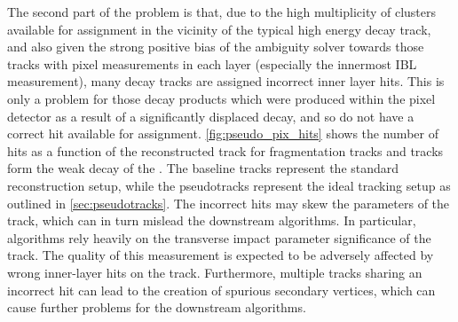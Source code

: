 The second part of the problem is that, due to the high multiplicity of clusters available for assignment in the vicinity of the typical high energy \bhadron decay track, and also given the strong positive bias of the ambiguity solver towards those tracks with pixel measurements in each layer (especially the innermost IBL measurement), many \bhadron decay tracks are assigned incorrect inner layer hits.
This is only a problem for those decay products which were produced within the pixel detector as a result of a significantly displaced \bhadron decay, and so do not have a correct hit available for assignment.
\cref{fig:pseudo_pix_hits} shows the number of hits as a function of the reconstructed track \pt for fragmentation tracks and tracks form the weak decay of the \bhadron.
The baseline tracks represent the standard reconstruction setup, while the pseudotracks represent the ideal tracking setup as outlined in \cref{sec:pseudotracks}.
The incorrect hits may skew the parameters of the track, which can in turn mislead the downstream \btagging algorithms.
In particular, \btagging algorithms rely heavily on the transverse impact parameter significance \dzerosig of the track.
The quality of this measurement is expected to be adversely affected by wrong inner-layer hits on the track.
Furthermore, multiple tracks sharing an incorrect hit can lead to the creation of spurious secondary vertices, which can cause further problems for the downstream \btagging algorithms.


